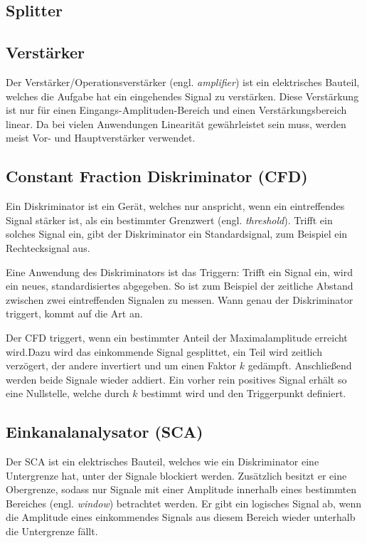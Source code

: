 \subsection{Splitter}

\subsection{Verstärker}

Der Verstärker/Operationsverstärker (engl. \emph{amplifier}) ist ein
elektrisches Bauteil, welches die Aufgabe hat ein eingehendes Signal zu
verstärken. Diese Verstärkung ist nur für einen Eingangs-Amplituden-Bereich und
einen Verstärkungsbereich linear. Da bei vielen Anwendungen Linearität
gewährleistet sein muss, werden meist Vor- und Hauptverstärker verwendet.

\subsection{Constant Fraction Diskriminator (CFD)}

Ein Diskriminator ist ein Gerät, welches nur anspricht, wenn ein eintreffendes
Signal stärker ist, als ein bestimmter Grenzwert (engl. \emph{threshold}).
Trifft ein solches Signal ein, gibt der Diskriminator ein Standardsignal, zum
Beispiel ein Rechtecksignal aus.

Eine Anwendung des Diskriminators ist das Triggern: Trifft ein Signal ein, wird
ein neues, standardisiertes abgegeben. So ist zum Beispiel der zeitliche
Abstand zwischen zwei eintreffenden Signalen zu messen. Wann genau der
Diskriminator triggert, kommt auf die Art an.

Der CFD triggert, wenn ein bestimmter Anteil der Maximalamplitude erreicht
wird.Dazu wird das einkommende Signal gesplittet, ein Teil wird zeitlich
verzögert, der andere invertiert und um einen Faktor $k$ gedämpft. Anschließend
werden beide Signale wieder addiert. Ein vorher rein positives Signal erhält so
eine Nullstelle, welche durch $k$ bestimmt wird und den Triggerpunkt definiert.

\subsection{Einkanalanalysator (SCA)}

Der SCA ist ein elektrisches Bauteil, welches wie ein Diskriminator eine
Untergrenze hat, unter der Signale blockiert werden. Zusätzlich besitzt er eine
Obergrenze, sodass nur Signale mit einer Amplitude innerhalb eines bestimmten
Bereiches (engl. \emph{window}) betrachtet werden. Er gibt ein logisches Signal
ab, wenn die Amplitude eines einkommendes Signals aus diesem Bereich wieder
unterhalb die Untergrenze fällt.


